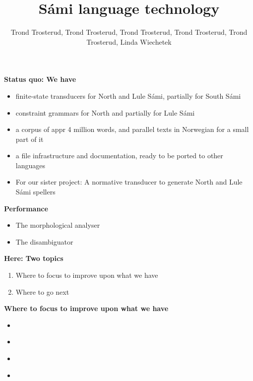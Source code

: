 \documentclass[landscape,english,11pt]{seminar}
\title{Sámi language technology}
\author{Trond Trosterud, 
Trond Trosterud, 
Trond Trosterud, 
Trond Trosterud, 
Trond Trosterud, 
Linda Wiechetek}
\begin{document}
\begin{slide}

\maketitle

\newslide
\textbf{Status quo: We have}
\begin{itemize}
\item finite-state transducers for North and Lule Sámi, partially for South Sámi
\item constraint grammars for North and partially for Lule Sámi
\item a corpus of appr 4 million words, and parallel texts in Norwegian for a small part of it
\item a file infrastructure and documentation, ready to be ported to other languages
\item For our sister project: A normative transducer to generate North and Lule Sámi spellers
\end{itemize}


\newslide
\textbf{Performance}
\begin{itemize}
\item The morphological analyser
\item The disambiguator
\end{itemize}

\newslide
\textbf{Here: Two topics}
\begin{enumerate}
\item Where to focus to improve upon what we have
\item Where to go next
\end{enumerate}


\newslide
\textbf{Where to focus to improve upon what we have}
\begin{itemize}
\item
\end{itemize}


\newslide
\textbf{}
\begin{itemize}
\item
\end{itemize}


\newslide
\textbf{}
\begin{itemize}
\item
\end{itemize}


\newslide
\textbf{}
\begin{itemize}
\item
\end{itemize}



\end{slide}
\end{document}
